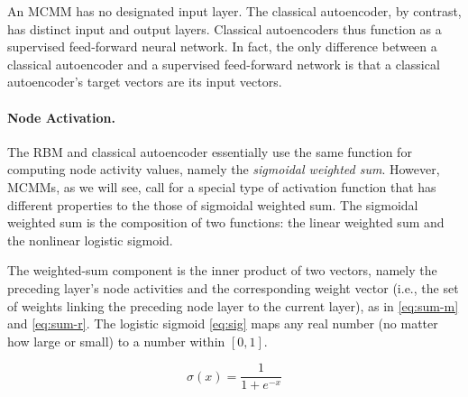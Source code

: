 

An MCMM has no designated input layer. The classical autoencoder, by contrast, has distinct input and output layers. Classical autoencoders thus function as a supervised feed-forward neural network. In fact, the only difference between a classical autoencoder and a supervised feed-forward network is that a classical autoencoder's target vectors are its input vectors.

\paragraph{Node Activation.} The RBM and classical autoencoder essentially use the same function for computing node activity values, namely the \emph{sigmoidal weighted sum}.
 However, MCMMs, as we will see, call for a special type of activation function that has different properties to the those of  sigmoidal weighted sum.
The sigmoidal weighted sum is the composition of two functions: the linear weighted sum and the nonlinear logistic sigmoid. 

The weighted-sum component is the inner product of two vectors, namely the preceding layer's node activities and the corresponding weight vector (i.e., the set of weights linking the preceding node layer to the current layer),
as in \eqref{eq:sum-m} and \eqref{eq:sum-r}.
The logistic sigmoid \eqref{eq:sig} maps any real number (no matter how large or small) to a number within $[0,1]$.



	\begin{equation} %
	\label{eq:sig}
	\sigma(x) = \frac{1}{1 + e^{-x}} 
	\end{equation} %
	
